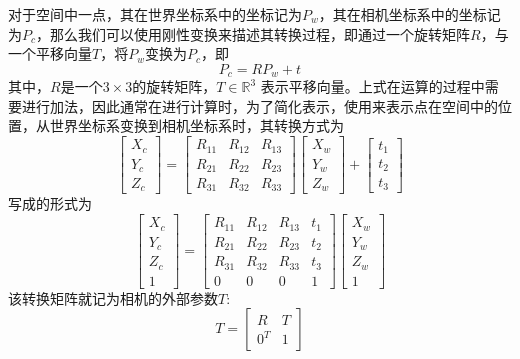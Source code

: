 对于空间中一点，其在世界坐标系中的坐标记为\(P_w\)，其在相机坐标系中的坐标记为\(P_c\)，那么我们可以使用刚性变换来描述其转换过程，即通过一个旋转矩阵\(R\)，与一个平移向量\(T\)，将\(P_w\)变换为\(P_c\)，即
\begin{equation}
    P_c = RP_w + t
\end{equation}
其中，\(R\)是一个\(3\times 3\)的旋转矩阵，\(T \in \mathbb{R}^{3}\) 表示平移向量。上式在运算的过程中需要进行加法，因此通常在进行计算时，为了简化表示，使用\qczb 来表示点在空间中的位置，从世界坐标系变换到相机坐标系时，其转换方式为
\begin{equation}
    \left[\begin{array}{c}X_c\\Y_c\\Z_c\end{array}\right] = \left[\begin{array}{ccc}R_{11}&R_{12}&R_{13}\\R_{21}&R_{22}&R_{23}\\R_{31}&R_{32}&R_{33}\end{array}\right]\left[\begin{array}{c}X_w\\Y_w\\Z_w\end{array}\right] + \left[\begin{array}{c}t_1\\t_2\\t_3\end{array}\right]
\end{equation}
写成\qczb 的形式为
\begin{equation}
    \left[\begin{array}{c}X_c\\Y_c\\Z_c\\1 \end{array}\right] =
    \left[\begin{array}{cccc}R_{11}&R_{12}&R_{13}&t_1\\R_{21}&R_{22}&R_{23}&t_2\\R_{31}&R_{32}&R_{33}&t_3\\0&0&0&1\end{array}\right]
    \left[\begin{array}{c}X_w\\Y_w\\Z_w\\1\end{array}\right]
\end{equation}
该转换矩阵就记为相机的外部参数\(T\):
\begin{equation}
    T = \left[\begin{array}{cc}R&T\\0^T&1\end{array}\right]
\end{equation}

